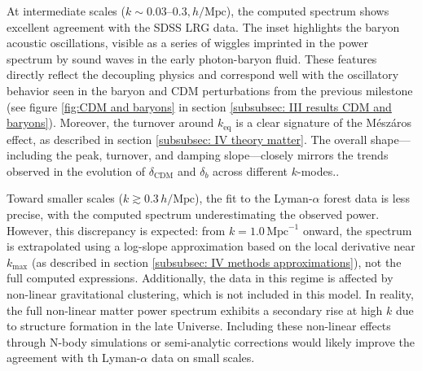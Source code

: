 \documentclass{aa}
\numberwithin{equation}{section}
\numberwithin{table}{section}
\numberwithin{figure}{section}
\begin{document}
At intermediate scales ($k \sim 0.03$--$0.3,h/\text{Mpc}$), the computed spectrum shows excellent agreement with the SDSS LRG data. The inset highlights the baryon acoustic oscillations, visible as a series of wiggles imprinted in the power spectrum by sound waves in the early photon-baryon fluid. These features directly reflect the decoupling physics and correspond well with the oscillatory behavior seen in the baryon and CDM perturbations from the previous milestone (see figure \ref{fig:CDM and baryons} in section \ref{subsubsec: III results CDM and baryons}). Moreover, the turnover around $k_\text{eq}$ is a clear signature of the Mészáros effect, as described in section \ref{subsubsec: IV theory matter}. The overall shape—including the peak, turnover, and damping slope—closely mirrors the trends observed in the evolution of $\delta_\text{CDM}$ and $\delta_b$ across different $k$-modes..

Toward smaller scales ($k \gtrsim 0.3\,h/\text{Mpc}$), the fit to the Lyman-$\alpha$ forest data is less precise, with the computed spectrum underestimating the observed power. However, this discrepancy is expected: from $k = 1.0\,\text{Mpc}^{-1}$ onward, the spectrum is extrapolated using a log-slope approximation based on the local derivative near $k_\text{max}$ (as described in section \ref{subsubsec: IV methods approximations}), not the full computed expressions. Additionally, the data in this regime is affected by non-linear gravitational clustering, which is not included in this model. In reality, the full non-linear matter power spectrum exhibits a secondary rise at high $k$ due to structure formation in the late Universe. Including these non-linear effects through N-body simulations or semi-analytic corrections would likely improve the agreement with th Lyman-$\alpha$ data on small scales.

\end{document}

